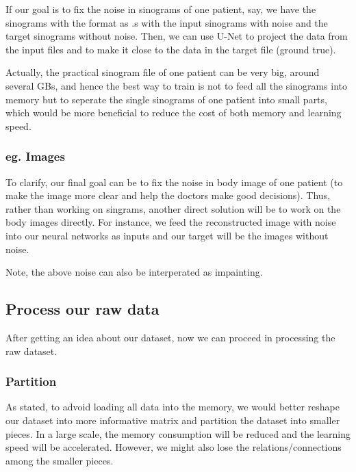 \documentclass[letterpaper,10pt,english]{sphinxmanual}
\let\sphinxpxdimen\pdfpxdimen\else\newdimen\sphinxpxdimen
\begin{document}
\noindent{\hspace*{\fill}\sphinxincludegraphics[width=300\sphinxpxdimen]{{sinograms}.png}\hspace*{\fill}}

If our goal is to fix the noise in sinograms of one patient, say, we have the sinograms with the format as .s with the input sinograms with noise and the target sinograms without noise. Then, we can use U-Net to project the data from the input files and to make it close to the data in the target file (ground true).

Actually, the practical sinogram file of one patient can be very big, around several GBs, and hence the best way to train is not to feed all the sinograms into memory but to seperate the single sinograms of one patient into small parts, which would be more beneficial to reduce the cost of both memory and learning speed.


\subsubsection{eg. Images}
\label{\detokenize{usage/data:eg-images}}
\noindent{\hspace*{\fill}\sphinxincludegraphics[width=300\sphinxpxdimen]{{images}.PNG}\hspace*{\fill}}

To clarify, our final goal can be to fix the noise in body image of one patient (to make the image more clear and help the doctors make good decisions). Thus, rather than working on singrams, another direct solution will be to work on the body images directly. For instance, we feed the reconstructed image with noise into our neural networks as inputs and our target will be the images without noise.

Note, the above noise can also be interperated as impainting.


\subsection{Process our raw data}
\label{\detokenize{usage/data:process-our-raw-data}}
After getting an idea about our dataset, now we can proceed in processing the raw dataset.


\subsubsection{Partition}
\label{\detokenize{usage/data:partition}}
As stated, to advoid loading all data into the memory, we would better reshape our dataset into more informative matrix and partition the dataset into smaller pieces. In a large scale, the memory consumption will be reduced and the learning speed will be accelerated. However, we might also lose the relations/connections among the smaller pieces.
\end{document}
